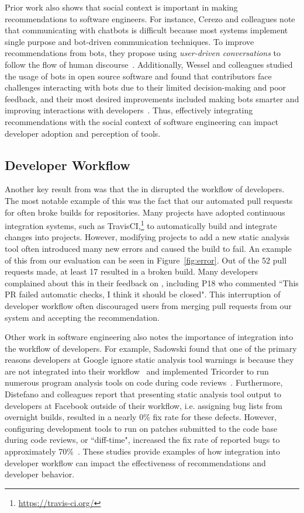 Prior work also shows that social context is important in making recommendations to software engineers. For instance, Cerezo and colleagues note that communicating with chatbots is difficult because most systems implement single purpose and bot-driven communication techniques. To improve recommendations from bots, they propose using \textit{user-driven conversations} to follow the flow of human discourse~\cite{cerezo2019building}. Additionally, Wessel and colleagues studied the usage of bots in open source software and found that contributors face challenges interacting with bots due to their limited decision-making and poor feedback, and their most desired improvements included making bots smarter and improving interactions with developers~\cite{wessel2018power}. Thus, effectively integrating recommendations with the social context of software engineering can impact developer adoption and perception of tools.

\subsection{Developer Workflow}

Another key result from \sorry was that the \tele in \tool disrupted the workflow of developers. The most notable example of this was the fact that our automated pull requests for \EP often broke builds for repositories. Many projects have adopted continuous integration systems, such as TravisCI,\footnote{\url{https://travis-ci.org/}} to automatically build and integrate changes into projects. However, modifying projects to add a new static analysis tool often introduced many new errors and caused the build to fail. An example of this from our evaluation can be seen in Figure~\ref{fig:error}. Out of the 52 pull requests made, at least 17 resulted in a broken build. Many developers complained about this in their feedback on \tool, including P18 who commented ``This PR failed automatic checks, I think it should be closed". This interruption of developer workflow often discouraged users from merging pull requests from our system and accepting the recommendation.

Other work in software engineering also notes the importance of integration into the workflow of developers. For example, Sadowski found that one of the primary reasons developers at Google ignore static analysis tool warnings is because they are not integrated into their workflow~\cite{sadowski2018lessons} and implemented Tricorder to run numerous program analysis tools on code during code reviews~\cite{Tricorder}. Furthermore, Distefano and colleagues report that presenting static analysis tool output to developers at Facebook outside of their workflow, i.e. assigning bug lists from overnight builds, resulted in a nearly 0\% fix rate for these defects. However, configuring development tools to run on patches submitted to the code base during code reviews, or ``diff-time", increased the fix rate of reported bugs to approximately 70\%~\cite{Distefano2019Facebook}. These studies provide examples of how integration into developer workflow can impact the effectiveness of recommendations and developer behavior.

